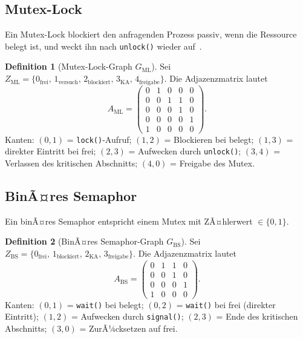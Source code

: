 ﻿\documentclass[a4paper,12pt]{article}
\theoremstyle{definition}
\newtheorem{definition}{Definition}
\begin{document}
\subsection{Mutex-Lock}

Ein Mutex-Lock blockiert den anfragenden Prozess passiv, wenn die Ressource
belegt ist, und weckt ihn nach \texttt{unlock()} wieder auf~\cite{silberschatz2018os}.

\begin{definition}[Mutex-Lock-Graph $G_{\mathrm{ML}}$]
  \label{def:ml}
  Sei $Z_{\mathrm{ML}} = \{0_{\mathrm{frei}},\, 1_{\mathrm{versuch}},\, 2_{\mathrm{blockiert}},\, 3_{\mathrm{KA}},\, 4_{\mathrm{freigabe}}\}$.
  Die Adjazenzmatrix lautet
  \[
    A_{\mathrm{ML}} =
    \begin{pmatrix}
      0 & 1 & 0 & 0 & 0 \\
      0 & 0 & 1 & 1 & 0 \\
      0 & 0 & 0 & 1 & 0 \\
      0 & 0 & 0 & 0 & 1 \\
      1 & 0 & 0 & 0 & 0
    \end{pmatrix}.
  \]
  Kanten: $(0,1)$ = \texttt{lock()}-Aufruf;
  $(1,2)$ = Blockieren bei belegt;
  $(1,3)$ = direkter Eintritt bei frei;
  $(2,3)$ = Aufwecken durch \texttt{unlock()};
  $(3,4)$ = Verlassen des kritischen Abschnitts;
  $(4,0)$ = Freigabe des Mutex.
\end{definition}

\subsection{BinÃ¤res Semaphor}

Ein binÃ¤res Semaphor entspricht einem Mutex mit ZÃ¤hlerwert $\in \{0,1\}$.

\begin{definition}[BinÃ¤res Semaphor-Graph $G_{\mathrm{BS}}$]
  \label{def:bs}
  Sei $Z_{\mathrm{BS}} = \{0_{\mathrm{frei}},\, 1_{\mathrm{blockiert}},\, 2_{\mathrm{KA}},\, 3_{\mathrm{freigabe}}\}$.
  Die Adjazenzmatrix lautet
  \[
    A_{\mathrm{BS}} =
    \begin{pmatrix}
      0 & 1 & 1 & 0 \\
      0 & 0 & 1 & 0 \\
      0 & 0 & 0 & 1 \\
      1 & 0 & 0 & 0
    \end{pmatrix}.
  \]
  Kanten: $(0,1)$ = \texttt{wait()} bei belegt;
  $(0,2)$ = \texttt{wait()} bei frei (direkter Eintritt);
  $(1,2)$ = Aufwecken durch \texttt{signal()};
  $(2,3)$ = Ende des kritischen Abschnitts;
  $(3,0)$ = ZurÃ¼cksetzen auf frei.
\end{definition}
\end{document}

